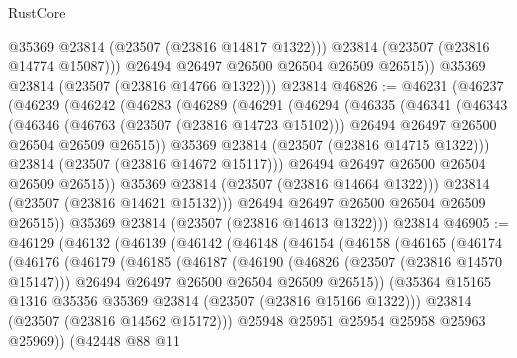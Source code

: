 \begin{lexlean}{RustCore}
\begin{coremodule}
              @35369
              @23814
              (@23507 (@23816 @14817 @1322)))
            @23814
            (@23507 (@23816 @14774 @15087)))
          @26494
          @26497
          @26500
          @26504
          @26509
          @26515))
      @35369
      @23814
      (@23507 (@23816 @14766 @1322)))
    @23814
@46826 := @46231
    (@46237
      (@46239
        (@46242
          (@46283
            (@46289
              (@46291
                (@46294
                  (@46335
                    (@46341
                      (@46343
                        (@46346
                          (@46763 (@23507 (@23816 @14723 @15102)))
                          @26494
                          @26497
                          @26500
                          @26504
                          @26509
                          @26515))
                      @35369
                      @23814
                      (@23507 (@23816 @14715 @1322)))
                    @23814
                    (@23507 (@23816 @14672 @15117)))
                  @26494
                  @26497
                  @26500
                  @26504
                  @26509
                  @26515))
              @35369
              @23814
              (@23507 (@23816 @14664 @1322)))
            @23814
            (@23507 (@23816 @14621 @15132)))
          @26494
          @26497
          @26500
          @26504
          @26509
          @26515))
      @35369
      @23814
      (@23507 (@23816 @14613 @1322)))
    @23814
@46905 := @46129
    (@46132
      (@46139
        (@46142
          (@46148
            (@46154
              (@46158
                (@46165
                  (@46174
                    (@46176
                      (@46179
                        (@46185
                          (@46187
                            (@46190
                              (@46826 (@23507 (@23816 @14570 @15147)))
                              @26494
                              @26497
                              @26500
                              @26504
                              @26509
                              @26515))
                          (@35364 @15165 @1316 @35356 @35369 @23814 (@23507 (@23816 @15166 @1322)))
                          @23814
                          (@23507 (@23816 @14562 @15172)))
                        @25948
                        @25951
                        @25954
                        @25958
                        @25963
                        @25969))
                    (@42448
                      @88
                      @11

\end{coremodule}
\end{lexlean}
